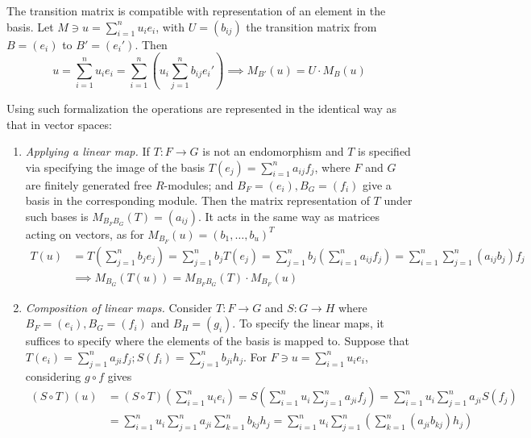 \begin{remark}
    The transition matrix is compatible with representation of an element in the basis. Let $M \ni u = \sum_{i=1}^n u_i e_i$, with $U = (b_{ij})$ the transition matrix from $B = (e_i)$ to $B' = (e_i')$. Then 
    \[
        u = \sum\limits_{i = 1}^n u_i e_i = \sum\limits_{i=1}^n \left(u_i \sum\limits_{j=1}^n b_{ij} e_i'\right) \implies M_{B'}(u) = U\cdot M_{B}(u)
    \]
\end{remark}

\begin{remark}
    Using such formalization the operations are represented in the identical way as that in vector spaces:
    \begin{enumerate}
        \item \emph{Applying a linear map.} If $T: F\to G$ is not an endomorphism and $T$ is specified via specifying the image of the basis $T(e_j) = \sum_{i=1}^n a_{ij} f_j$, where $F$ and $G$ are finitely generated free $R$-modules; and $B_F = (e_i), B_G = (f_i)$ give a basis in the corresponding module. Then the matrix representation of $T$ under such bases is $M_{B_F B_G}(T) = (a_{ij})$. It acts in the same way as matrices acting on vectors, as for $M_{B_F}(u) = (b_1, \ldots, b_u)^T$
        \begin{align*}
            T(u) & = T\left( \sum_{j=1}^n b_j e_j \right) = \sum_{j=1}^n b_j T\left( e_j \right) = \sum_{j=1}^n b_j \left( \sum_{i=1}^n a_{ij} f_j \right) = \sum_{i=1}^n \sum_{j=1}^n (a_{ij} b_j) f_j \\
            & \implies M_{B_G}(T(u)) = M_{B_F B_G}(T) \cdot M_{B_F}(u) \qquad \qquad \qquad \qquad \qquad \quad
        \end{align*}
        \item \emph{Composition of linear maps.} Consider $T: F \to G$ and $S: G \to H$ where $B_F = (e_i), B_G = (f_i)$ and $B_H = (g_i)$. To specify the linear maps, it suffices to specify where the elements of the basis is mapped to. Suppose that $T(e_i) = \sum_{j=1}^n a_{ji} f_j; S(f_i) = \sum_{j=1}^n b_{ji} h_j$. For $F \ni u = \sum_{i=1}^n u_i e_i$, considering $g \circ f$ gives
        \begin{align*}
            (S\circ T)(u)
            & = (S\circ T)\left( \sum_{i=1}^n u_i e_i \right) = S\left( \sum_{i=1}^n u_i \sum_{j=1}^n a_{ji} f_j \right) = \sum_{i=1}^{n} u_i \sum_{j=1}^{n} a_{ji} S(f_j) \\
            & = \sum_{i=1}^{n} u_i \sum_{j=1}^{n} a_{ji} \sum_{k=1}^n b_{kj} h_j = \sum_{i=1}^n u_i \sum_{j=1}^{n} \left(\sum_{k=1}^{n} (a_{ji}b_{kj}) h_j\right) \\

\end{align*}
\end{enumerate}
\end{remark}
